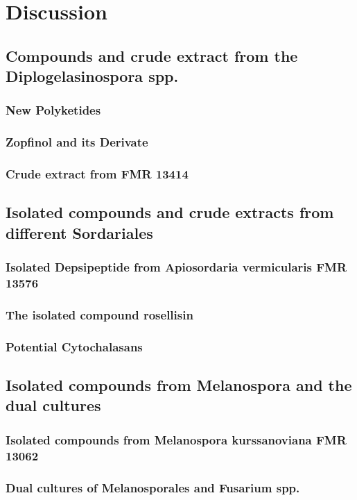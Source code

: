 \chapter{Discussion}

\section{Compounds and crude extract from the Diplogelasinospora spp.}
\subsection{New Polyketides}
\subsection{Zopfinol and its Derivate}
\subsection{Crude extract from FMR 13414}


\section{Isolated compounds and crude extracts from different Sordariales}
\subsection{Isolated Depsipeptide from Apiosordaria vermicularis FMR 13576}
\subsection{The isolated compound rosellisin}
\subsection{Potential Cytochalasans}

\section{Isolated compounds from Melanospora and the dual cultures}
\subsection{Isolated compounds from Melanospora kurssanoviana FMR 13062}
\subsection{Dual cultures of Melanosporales and Fusarium spp.}









